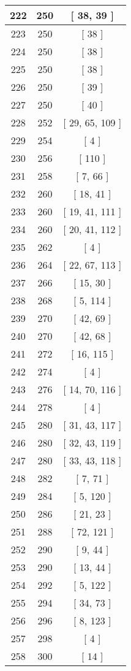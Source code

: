 \begin{center}
\begin{longtable}[H]{|| c c c ||}
222 & 250 & [ 38, 39 ]
\\\hline
223 & 250 & [ 38 ]
\\\hline
224 & 250 & [ 38 ]
\\\hline
225 & 250 & [ 38 ]
\\\hline
226 & 250 & [ 39 ]
\\\hline
227 & 250 & [ 40 ]
\\\hline
228 & 252 & [ 29, 65, 109 ]
\\\hline
229 & 254 & [ 4 ]
\\\hline
230 & 256 & [ 110 ]
\\\hline
231 & 258 & [ 7, 66 ]
\\\hline
232 & 260 & [ 18, 41 ]
\\\hline
233 & 260 & [ 19, 41, 111 ]
\\\hline
234 & 260 & [ 20, 41, 112 ]
\\\hline
235 & 262 & [ 4 ]
\\\hline
236 & 264 & [ 22, 67, 113 ]
\\\hline
237 & 266 & [ 15, 30 ]
\\\hline
238 & 268 & [ 5, 114 ]
\\\hline
239 & 270 & [ 42, 69 ]
\\\hline
240 & 270 & [ 42, 68 ]
\\\hline
241 & 272 & [ 16, 115 ]
\\\hline
242 & 274 & [ 4 ]
\\\hline
243 & 276 & [ 14, 70, 116 ]
\\\hline
244 & 278 & [ 4 ]
\\\hline
245 & 280 & [ 31, 43, 117 ]
\\\hline
246 & 280 & [ 32, 43, 119 ]
\\\hline
247 & 280 & [ 33, 43, 118 ]
\\\hline
248 & 282 & [ 7, 71 ]
\\\hline
249 & 284 & [ 5, 120 ]
\\\hline
250 & 286 & [ 21, 23 ]
\\\hline
251 & 288 & [ 72, 121 ]
\\\hline
252 & 290 & [ 9, 44 ]
\\\hline
253 & 290 & [ 13, 44 ]
\\\hline
254 & 292 & [ 5, 122 ]
\\\hline
255 & 294 & [ 34, 73 ]
\\\hline
256 & 296 & [ 8, 123 ]
\\\hline
257 & 298 & [ 4 ]
\\\hline
258 & 300 & [ 14 ]

\end{longtable}
\end{center}
